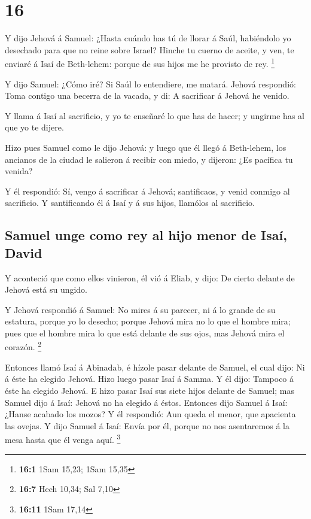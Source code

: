 \hypertarget{section-15}{%
\section{16}\label{section-15}}

 Y dijo Jehová á Samuel: ¿Hasta cuándo has tú de llorar á
Saúl, habiéndolo yo desechado para que no reine sobre Israel? Hinche tu
cuerno de aceite, y ven, te enviaré á Isaí de Beth-lehem: porque de sus
hijos me he provisto de rey. \footnote{\textbf{16:1} 1Sam 15,23; 1Sam
  15,35}

 Y dijo Samuel: ¿Cómo iré? Si Saúl lo entendiere, me matará.
Jehová respondió: Toma contigo una becerra de la vacada, y di: A
sacrificar á Jehová he venido.

 Y llama á Isaí al sacrificio, y yo te enseñaré lo que has
de hacer; y ungirme has al que yo te dijere.

 Hizo pues Samuel como le dijo Jehová: y luego que él llegó
á Beth-lehem, los ancianos de la ciudad le salieron á recibir con miedo,
y dijeron: ¿Es pacífica tu venida?

 Y él respondió: Sí, vengo á sacrificar á Jehová;
santificaos, y venid conmigo al sacrificio. Y santificando él á Isaí y á
sus hijos, llamólos al sacrificio.

\hypertarget{samuel-unge-como-rey-al-hijo-menor-de-isauxed-david}{%
\subsection{Samuel unge como rey al hijo menor de Isaí,
David}\label{samuel-unge-como-rey-al-hijo-menor-de-isauxed-david}}

 Y aconteció que como ellos vinieron, él vió á Eliab, y
dijo: De cierto delante de Jehová está su ungido.

 Y Jehová respondió á Samuel: No mires á su parecer, ni á lo
grande de su estatura, porque yo lo desecho; porque Jehová mira no lo
que el hombre mira; pues que el hombre mira lo que está delante de sus
ojos, mas Jehová mira el corazón. \footnote{\textbf{16:7} Hech 10,34;
  Sal 7,10}

 Entonces llamó Isaí á Abinadab, é hízole pasar delante de
Samuel, el cual dijo: Ni á éste ha elegido Jehová.  Hizo
luego pasar Isaí á Samma. Y él dijo: Tampoco á éste ha elegido Jehová.
 E hizo pasar Isaí sus siete hijos delante de Samuel; mas
Samuel dijo á Isaí: Jehová no ha elegido á éstos.  Entonces
dijo Samuel á Isaí: ¿Hanse acabado los mozos? Y él respondió: Aun queda
el menor, que apacienta las ovejas. Y dijo Samuel á Isaí: Envía por él,
porque no nos asentaremos á la mesa hasta que él venga aquí. \footnote{\textbf{16:11}
  1Sam 17,14}

